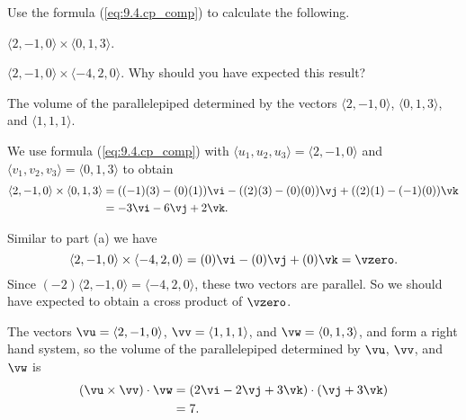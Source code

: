 \begin{activity} \label{A:9.4.5}  Use the formula (\ref{eq:9.4.cp_comp}) to calculate the following.
	\ba
	\item $\langle 2, -1, 0 \rangle \times \langle 0, 1, 3 \rangle$.
	
	
	
	\item $\langle 2, -1, 0 \rangle \times \langle -4, 2, 0 \rangle$. Why should you have expected this result?
	
	
	
	\item The volume of the parallelepiped determined by the vectors $\langle 2, -1, 0 \rangle$, $\langle 0, 1, 3 \rangle$, and $\langle 1, 1, 1 \rangle$.
	
	
	
	\ea
\end{activity}
\begin{smallhint}

\end{smallhint}
\begin{bighint}

\end{bighint}
\begin{activitySolution}
	\ba
	\item We use formula (\ref{eq:9.4.cp_comp}) with $\langle u_1, u_2, u_3 \rangle = \langle 2, -1, 0 \rangle$ and $\langle v_1, v_2, v_3 \rangle = \langle 0, 1, 3 \rangle$ to obtain
\begin{align*}
\langle 2, -1, 0 \rangle \times \langle 0, 1, 3 \rangle &= ((-1)(3)-(0)(1))\vi - ((2)(3)-(0)(0)) \vj + ((2)(1)-(-1)(0)) \vk \\
	&= -3\vi - 6\vj +2\vk.
\end{align*}
	\item Similar to part (a) we have 
\[\langle 2, -1, 0 \rangle \times \langle -4, 2, 0 \rangle = (0)\vi - (0) \vj + (0) \vk = \vzero.\]
Since $(-2)\langle 2, -1, 0 \rangle = \langle -4, 2, 0 \rangle$, these two vectors are parallel. So we should have expected to obtain a cross product of $\vzero$.
	\item The vectors $\vu = \langle 2, -1, 0 \rangle$, $\vv = \langle 1, 1, 1 \rangle$, and $\vw = \langle 0, 1, 3 \rangle$, and form a right hand system, so the volume of the parallelepiped determined by $\vu$, $\vv$, and $\vw$ is 
\begin{align*}
(\vu \times \vv) \cdot \vw &= (2\vi -2 \vj + 3\vk) \cdot (\vj + 3\vk) \\
		&= 7.
\end{align*}
	\ea
\end{activitySolution}
\aftera
